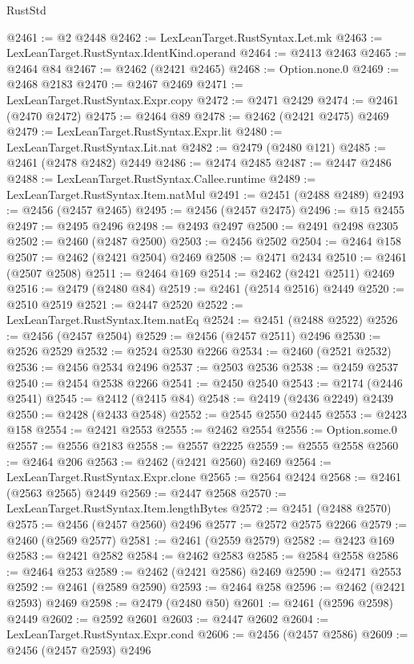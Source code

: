 \begin{lexlean}{RustStd}
\begin{coremodule}
@2461 := @2 @2448
@2462 := LexLeanTarget.RustSyntax.Let.mk
@2463 := LexLeanTarget.RustSyntax.IdentKind.operand
@2464 := @2413 @2463
@2465 := @2464 @84
@2467 := @2462 (@2421 @2465)
@2468 := Option.none.{0}
@2469 := @2468 @2183
@2470 := @2467 @2469
@2471 := LexLeanTarget.RustSyntax.Expr.copy
@2472 := @2471 @2429
@2474 := @2461 (@2470 @2472)
@2475 := @2464 @89
@2478 := @2462 (@2421 @2475) @2469
@2479 := LexLeanTarget.RustSyntax.Expr.lit
@2480 := LexLeanTarget.RustSyntax.Lit.nat
@2482 := @2479 (@2480 @121)
@2485 := @2461 (@2478 @2482) @2449
@2486 := @2474 @2485
@2487 := @2447 @2486
@2488 := LexLeanTarget.RustSyntax.Callee.runtime
@2489 := LexLeanTarget.RustSyntax.Item.natMul
@2491 := @2451 (@2488 @2489)
@2493 := @2456 (@2457 @2465)
@2495 := @2456 (@2457 @2475)
@2496 := @15 @2455
@2497 := @2495 @2496
@2498 := @2493 @2497
@2500 := @2491 @2498 @2305
@2502 := @2460 (@2487 @2500)
@2503 := @2456 @2502
@2504 := @2464 @158
@2507 := @2462 (@2421 @2504) @2469
@2508 := @2471 @2434
@2510 := @2461 (@2507 @2508)
@2511 := @2464 @169
@2514 := @2462 (@2421 @2511) @2469
@2516 := @2479 (@2480 @84)
@2519 := @2461 (@2514 @2516) @2449
@2520 := @2510 @2519
@2521 := @2447 @2520
@2522 := LexLeanTarget.RustSyntax.Item.natEq
@2524 := @2451 (@2488 @2522)
@2526 := @2456 (@2457 @2504)
@2529 := @2456 (@2457 @2511) @2496
@2530 := @2526 @2529
@2532 := @2524 @2530 @2266
@2534 := @2460 (@2521 @2532)
@2536 := @2456 @2534 @2496
@2537 := @2503 @2536
@2538 := @2459 @2537
@2540 := @2454 @2538 @2266
@2541 := @2450 @2540
@2543 := @2174 (@2446 @2541)
@2545 := @2412 (@2415 @84)
@2548 := @2419 (@2436 @2249) @2439
@2550 := @2428 (@2433 @2548)
@2552 := @2545 @2550 @2445
@2553 := @2423 @158
@2554 := @2421 @2553
@2555 := @2462 @2554
@2556 := Option.some.{0}
@2557 := @2556 @2183
@2558 := @2557 @2225
@2559 := @2555 @2558
@2560 := @2464 @206
@2563 := @2462 (@2421 @2560) @2469
@2564 := LexLeanTarget.RustSyntax.Expr.clone
@2565 := @2564 @2424
@2568 := @2461 (@2563 @2565) @2449
@2569 := @2447 @2568
@2570 := LexLeanTarget.RustSyntax.Item.lengthBytes
@2572 := @2451 (@2488 @2570)
@2575 := @2456 (@2457 @2560) @2496
@2577 := @2572 @2575 @2266
@2579 := @2460 (@2569 @2577)
@2581 := @2461 (@2559 @2579)
@2582 := @2423 @169
@2583 := @2421 @2582
@2584 := @2462 @2583
@2585 := @2584 @2558
@2586 := @2464 @253
@2589 := @2462 (@2421 @2586) @2469
@2590 := @2471 @2553
@2592 := @2461 (@2589 @2590)
@2593 := @2464 @258
@2596 := @2462 (@2421 @2593) @2469
@2598 := @2479 (@2480 @50)
@2601 := @2461 (@2596 @2598) @2449
@2602 := @2592 @2601
@2603 := @2447 @2602
@2604 := LexLeanTarget.RustSyntax.Expr.cond
@2606 := @2456 (@2457 @2586)
@2609 := @2456 (@2457 @2593) @2496

\end{coremodule}
\end{lexlean}
